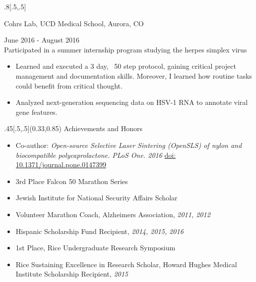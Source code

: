 \documentclass{article}
\begin{document}
\begin{titlepage}
\begin{center}
\begin{textblock}{.8}[.5,.5]
			
			
			
			
		{\fontsize{12}{14}\headerfont Cohrs Lab, UCD Medical School, Aurora, CO}
		\raggedright{\fontsize{12}{14}\regfont \hfill June 2016 - August 2016 \\
		\smallskip
		\fontsize{12}{14}\bodyfont Participated in a summer internship program studying the herpes simplex virus}
		\begin{itemize}
				\renewcommand{\labelitemi}{\scriptsize$\blacksquare$}
				\item{ \fontsize{12}{14}\bodyfont Learned and executed a 3 day, ~50 step protocol, gaining critical project management and documentation skills. Moreover, I learned how routine tasks could benefit from  critical thought.}
				\item{ \fontsize{12}{14}\bodyfont Analyzed next-generation sequencing data on HSV-1 RNA to annotate viral gene features.}
			\end{itemize}
	\end{textblock}
	
	

	\begin{textblock}{.45}[.5,.5](0.33,0.85)
		{\fontsize{16}{1}\headerfont Achievements and Honors }
		\smallskip
				\begin{itemize}
				\renewcommand{\labelitemi}{\scriptsize$\blacksquare$}
				\item{ \fontsize{12}{14}\bodyfont Co-author: \textit{Open-source Selective Laser Sintering (OpenSLS) of nylon and biocompatible polycaprolactone. PLoS One. 2016} \href{http://dx.doi.org/10.1371/journal.pone.0147399}{doi: 10.1371/journal.pone.0147399}}
				\item{ \fontsize{12}{14}\bodyfont 3rd Place Falcon 50 Marathon Series}
				\item{ \fontsize{12}{14}\bodyfont Jewish Institute for National Security Affairs Scholar}
				\item{ \fontsize{12}{14}\bodyfont Volunteer Marathon Coach, Alzheimers Association, \textit{2011, 2012}}
				\item{ \fontsize{12}{14}\bodyfont Hispanic Scholarship Fund Recipient, \textit{2014, 2015, 2016}}
				\item{ \fontsize{12}{14}\bodyfont 1st Place, Rice Undergraduate Research Symposium}
				\item{ \fontsize{12}{14}\bodyfont Rice Sustaining Excellence in Research Scholar, Howard Hughes Medical Institute Scholarship Recipient, \textit{2015}}
			\end{itemize}


\end{textblock}
\end{center}
\end{titlepage}
\end{document}
